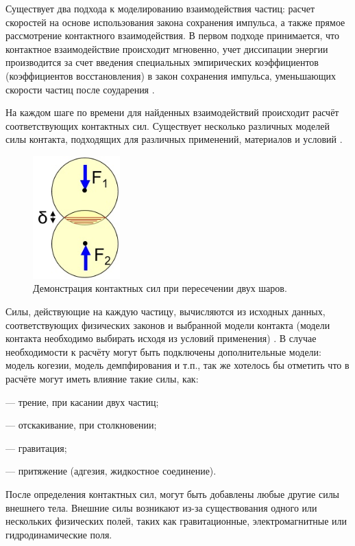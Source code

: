 \documentclass[utf8x, 14pt, oneside, a4paper]{article}
\begin{document}
Существует два подхода к моделированию взаимодействия частиц: расчет скоростей на основе использования закона сохранения импульса, а также прямое рассмотрение контактного взаимодействия. В первом подходе принимается, что контактное взаимодействие происходит мгновенно, учет диссипации энергии производится за счет введения специальных эмпирических коэффициентов (коэффициентов восстановления) в закон сохранения импульса, уменьшающих скорости частиц после соударения \cite{cundall}.

На каждом шаге по времени для найденных взаимодействий происходит расчёт соответствующих контактных сил.
Существует несколько различных моделей силы контакта, подходящих для различных применений, материалов и условий \cite{hard_aglomerath}.

\begin{figure}[H]
	\centering
	\includegraphics[width=0.3\textwidth]{vhod}
	\caption{Демонстрация контактных сил при пересечении двух шаров.}
\end{figure} 

Силы, действующие на каждую частицу, вычисляются из исходных данных, соответствующих физических законов и выбранной модели контакта (модели контакта необходимо выбирать исходя из условий применения) \cite{some}. 
В случае необходимости к расчёту могут быть подключены дополнительные модели: модель когезии, модель демпфирования и т.п., так же хотелось бы отметить что в расчёте могут иметь влияние такие силы, как:

--- трение, при касании двух частиц;

--- отскакивание, при столкновении;

--- гравитация;

--- притяжение (адгезия, жидкостное соединение).

После определения контактных сил, могут быть добавлены любые другие силы внешнего тела. 
Внешние силы возникают из-за существования одного или нескольких физических полей, таких как гравитационные, электромагнитные или гидродинамические поля.
\end{document}
